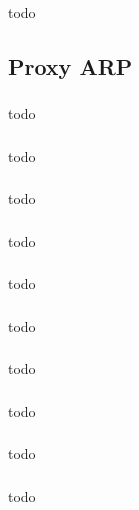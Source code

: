 \documentclass[a4paper, 12pt]{article}
\begin{document}
		\subsubsection{}
			todo
		
	\subsection{Proxy ARP}

		\subsubsection{}
			todo

		\subsubsection{}
			todo

		\subsubsection{}
			todo

		\subsubsection{}
			todo

		\subsubsection{}
			todo

		\subsubsection{}
			todo

		\subsubsection{}
			todo

		\subsubsection{}
			todo

		\subsubsection{}
			todo

		\subsubsection{}
			todo
\end{document}
